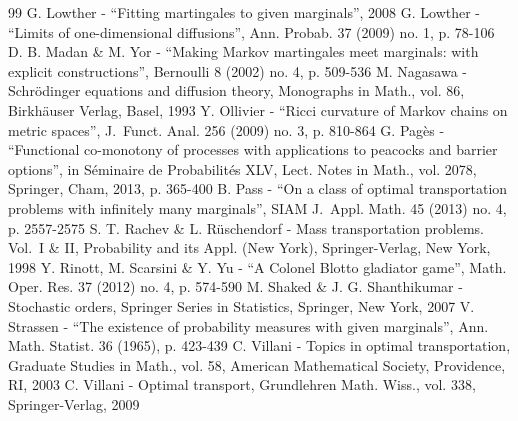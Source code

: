 \documentclass[10pt,a4paper]{article}
\theoremstyle{plain}
\theoremstyle{definition}
\begin{document}
\begin{thebibliography}{99}
 G. Lowther - “Fitting martingales to given marginals”, 2008
 G. Lowther - “Limits of one-dimensional diffusions”, Ann. Probab. 37 (2009) no. 1, p. 78-106
 D. B. Madan \& M. Yor - “Making Markov martingales meet marginals: with explicit constructions”, Bernoulli 8 (2002) no. 4, p. 509-536
 M. Nagasawa - Schrödinger equations and diffusion theory, Monographs in Math., vol. 86, Birkhäuser Verlag, Basel, 1993
 Y. Ollivier - “Ricci curvature of Markov chains on metric spaces”, J. Funct. Anal. 256 (2009) no. 3, p. 810-864
 G. Pagès - “Functional co-monotony of processes with applications to peacocks and barrier options”, in Séminaire de Probabilités XLV, Lect. Notes in Math., vol. 2078, Springer, Cham, 2013, p. 365-400
 B. Pass - “On a class of optimal transportation problems with infinitely many marginals”, SIAM J. Appl. Math. 45 (2013) no. 4, p. 2557-2575
 S. T. Rachev \& L. Rüschendorf - Mass transportation problems. Vol. I \& II, Probability and its Appl. (New York), Springer-Verlag, New York, 1998
 Y. Rinott, M. Scarsini \& Y. Yu - “A Colonel Blotto gladiator game”, Math. Oper. Res. 37 (2012) no. 4, p. 574-590
 M. Shaked \& J. G. Shanthikumar - Stochastic orders, Springer Series in Statistics, Springer, New York, 2007
 V. Strassen - “The existence of probability measures with given marginals”, Ann. Math. Statist. 36 (1965), p. 423-439
 C. Villani - Topics in optimal transportation, Graduate Studies in Math., vol. 58, American Mathematical Society, Providence, RI, 2003
 C. Villani - Optimal transport, Grundlehren Math. Wiss., vol. 338, Springer-Verlag, 2009
\end{thebibliography}
\end{document}

